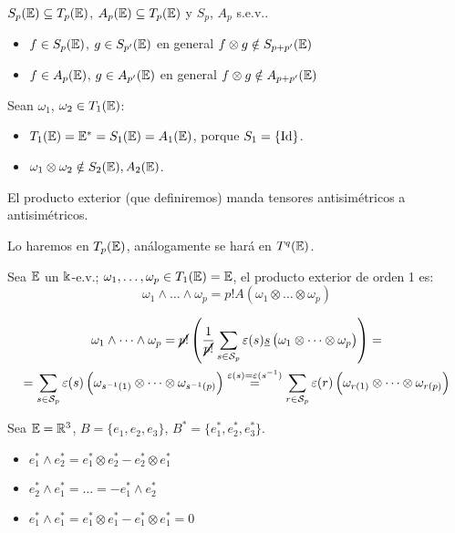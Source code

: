 \begin{obs}
    $S_p(\mathbb{E}) \subseteq T_p(\mathbb{E})$, $A_p(\mathbb{E}) \subseteq T_p(\mathbb{E})$ y $S_p$, $A_p$ s.e.v..
    \begin{itemize}
        \item $f \in S_p(\mathbb{E})$, $g \in S_{p'}(\mathbb{E})$ en general $f \otimes g \notin S_{p+p'}(\mathbb{E})$
        \item $f \in A_p(\mathbb{E})$, $g \in A_{p'}(\mathbb{E})$ en general $f \otimes g \notin A_{p+p'}(\mathbb{E})$
    \end{itemize}
\end{obs}
\begin{example}
    Sean $\omega_1$, $\omega_2 \in T_1(\mathbb{E})$:
    \begin{itemize}
        \item $T_1(\mathbb{E}) = \mathbb{E}^* = S_1(\mathbb{E}) = A_1(\mathbb{E})$, porque $S_1 = \{\operatorname{Id}\}$.
        \item $\omega_1 \otimes \omega_2 \notin S_2(\mathbb{E}), A_2(\mathbb{E})$.
    \end{itemize}
\end{example}
\begin{obs}
    El producto exterior (que definiremos) manda tensores antisimétricos a antisimétricos.
\end{obs}
\begin{obs}
    Lo haremos en $T_p(\mathbb{E})$, análogamente se hará en $T^q(\mathbb{E})$.
\end{obs}
\begin{defi} \label{pr_ext}
    Sea $\mathbb{E}$ un $\Bbbk$-e.v.; $\omega_1, \dots, \omega_p \in T_1(\mathbb{E}) = \mathbb{E}$, el producto exterior de orden 1 es:
    \[
        \omega_1 \wedge \dots \wedge \omega_p = p! A(\omega_1 \otimes \dots \otimes \omega_p)
    \]
\end{defi}
\begin{obs} \label{obs_pr_ext}
    \begin{gather*}
        \omega_1 \wedge \dots \wedge \omega_p = \cancel{p!}  \left( \frac{1}{\cancel{p!}}\sum_{s \in \mathcal{S}_p} \varepsilon(s)
        \underline{s}\left(\omega_1 \otimes \dots \otimes \omega_p \right) \right) = \\
        = \sum_{s \in \mathcal{S}_p} \varepsilon(s) \left( \omega_{s^{-1}(1)} \otimes \dots \otimes \omega_{s^{-1}(p)}
        \right) \stackrel{\varepsilon(s) = \varepsilon(s^{-1})}{=} \sum_{r \in \mathcal{S}_p}
        \varepsilon(r) \left( \omega_{r(1)} \otimes \dots \otimes \omega_{r(p)} \right)
    \end{gather*}
\end{obs}
\begin{example}
    Sea $\mathbb{E} = \mathbb{R}^3$, $B = \{e_1, e_2, e_3\}$, $B^* = \{ e_1^*, e_2^*, e_3^*\}$.
    \begin{itemize}
        \item $e_1^* \wedge e_2^* = e_1^* \otimes e_2^* - e_2^* \otimes e_1^*$
        \item $e_2^* \wedge e_1^* = \dots = -e_1^* \wedge e_2^*$
        \item $e_1^* \wedge e_1^* = e_1^* \otimes e_1^* - e_1^* \otimes e_1^* = 0$
    \end{itemize}
\end{example}
